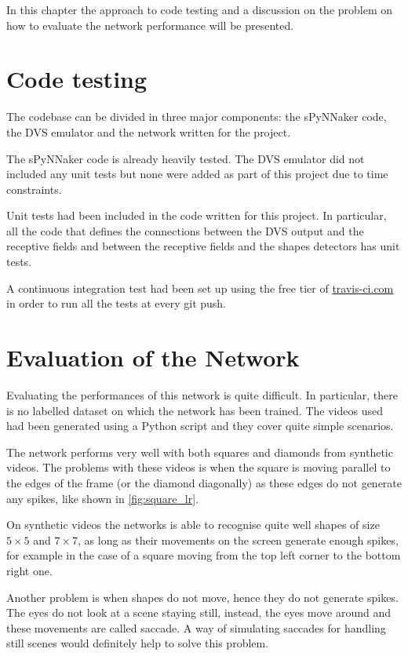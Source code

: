 In this chapter the approach to code testing and a discussion on the problem on how to evaluate the network performance will be presented.


\section{Code testing}
The codebase can be divided in three major components: the sPyNNaker code, the DVS emulator and the network written for the project. 

The sPyNNaker code is already heavily tested. The DVS emulator did not included any unit tests but none were added as part of this project due to time constraints. 

Unit tests had been included in the code written for this project. In particular, all the code that defines the connections between the DVS output and the receptive fields and between the receptive fields and the shapes detectors has unit tests. 

A continuous integration test had been set up using the free tier of \href{http://travis-ci.com}{travis-ci.com} in order to run all the tests at every git push. 


\section{Evaluation of the Network}
Evaluating the performances of this network is quite difficult. In particular, there is no labelled dataset on which the network has been trained. 
The videos used had been generated using a Python script and they cover quite simple scenarios. 

The network performs very well with both squares and diamonds from synthetic videos. The problems with these videos is when the square is moving parallel to the edges of the frame (or the diamond diagonally) as these edges do not generate any spikes, like shown in \cref{fig:square_lr}. 

On synthetic videos the networks is able to recognise quite well shapes of size $5 \times 5$ and $7 \times 7$, as long as their movements on the screen generate enough spikes, for example in the case of a square moving from the top left corner to the bottom right one. 

Another problem is when shapes do not move, hence they do not generate spikes. The eyes do not look at a scene staying still, instead, the eyes move around and these movements are called saccade. A way of simulating saccades for handling still scenes would definitely help to solve this problem. 

